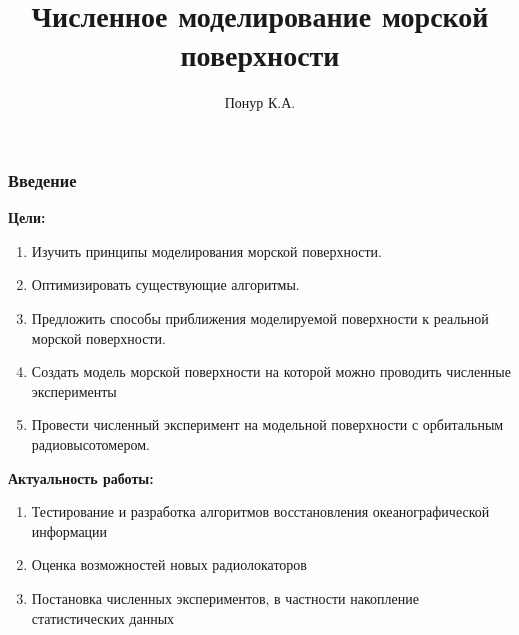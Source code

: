 \documentclass[10pt,pdf,hyperref={unicode}, dvipsnames]{beamer}
\begin{document}
\title[Моделирование морской поверхности]{Численное моделирование морской поверхности}

\author{Понур К.А.}




\begin{frame}[t]
	\frametitle{Введение}
	\vfill
	\textbf{Цели: }\\
		\begin{enumerate}
			\item Изучить принципы моделирования морской поверхности.

			\item Оптимизировать существующие алгоритмы.

            \item Предложить способы приближения моделируемой поверхности к
                реальной морской поверхности.
            \item Создать модель морской поверхности на которой можно проводить
                численные эксперименты 

            \item Провести численный эксперимент на модельной поверхности с
                орбитальным радиовысотомером.
		\end{enumerate}
		\vfill

	\textbf{Актуальность работы: }

	\begin{enumerate}
		\item Тестирование и разработка алгоритмов восстановления океанографической информации
		\item Оценка возможностей новых радиолокаторов
		\item Постановка численных экспериментов, в частности накопление статистических данных
	\end{enumerate}
	\vfill
\end{frame}
\end{document}
